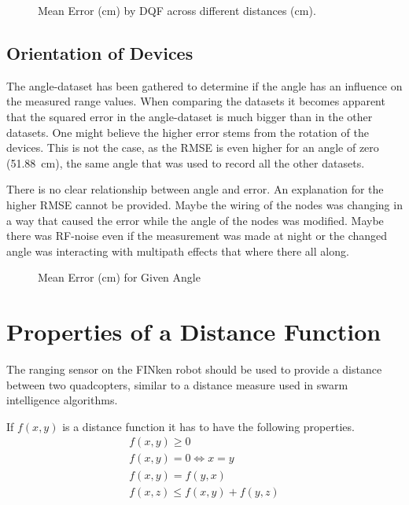 \begin{figure}[h]
	\centering
	
	\caption[Mean Error by DQF across different distances]{Mean Error (cm) by DQF across different distances (cm).}
	\label{me_dqf_distance}
\end{figure}

\subsection{Orientation of Devices}

The angle-dataset has been gathered to determine if the angle has an influence on the measured range values.
When comparing the datasets it becomes apparent that the squared error in the angle-dataset is much bigger than in the other datasets.
One might believe the higher error stems from the rotation of the devices.
This is not the case, as the RMSE is even higher for an angle of zero (\SI{51.88}{cm}), the same angle that was used to record all the other datasets.

There is no clear relationship between angle and error.
An explanation for the higher RMSE cannot be provided.
Maybe the wiring of the nodes was changing in a way that caused the error while the angle of the nodes was modified.
Maybe there was RF-noise even if the measurement was made at night or the changed angle was interacting with multipath effects that where there all along.
%	

\begin{figure}[h]
	\centering
	
	\caption[Mean Error for Given Angle]{Mean Error (cm) for Given Angle}
	\label{me_angle}
\end{figure}
\section{Properties of a Distance Function}
The ranging sensor on the FINken robot should be used to provide a distance between two quadcopters, similar to a distance measure used in swarm intelligence algorithms.

If $f(x, y)$ is a distance function it has to have the following properties.
\begin{eqnarray}
f(x, y) \ge 0 \\
f(x, y) = 0 \iff x = y \\ 
f(x, y) = f(y, x) \\ 
f(x, z) \le f(x, y) + f(y, z)
\end{eqnarray}

